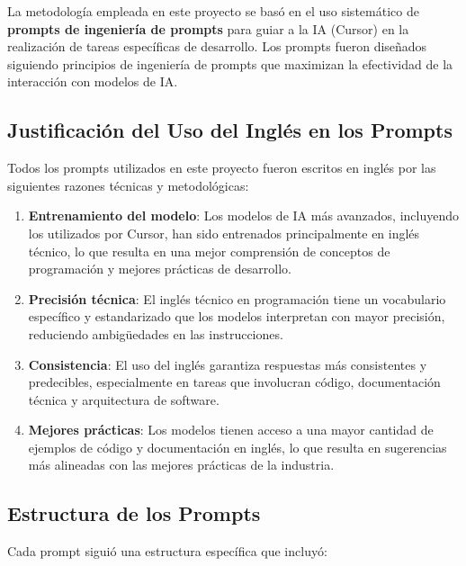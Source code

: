 \documentclass[12pt,a4paper]{article}
\begin{document}
La metodología empleada en este proyecto se basó en el uso sistemático de \textbf{prompts de ingeniería de prompts} para guiar a la IA (Cursor) en la realización de tareas específicas de desarrollo. Los prompts fueron diseñados siguiendo principios de ingeniería de prompts que maximizan la efectividad de la interacción con modelos de IA.

\subsection{Justificación del Uso del Inglés en los Prompts}

Todos los prompts utilizados en este proyecto fueron escritos en inglés por las siguientes razones técnicas y metodológicas:

\begin{enumerate}
    \item \textbf{Entrenamiento del modelo}: Los modelos de IA más avanzados, incluyendo los utilizados por Cursor, han sido entrenados principalmente en inglés técnico, lo que resulta en una mejor comprensión de conceptos de programación y mejores prácticas de desarrollo.
    
    \item \textbf{Precisión técnica}: El inglés técnico en programación tiene un vocabulario específico y estandarizado que los modelos interpretan con mayor precisión, reduciendo ambigüedades en las instrucciones.
    
    \item \textbf{Consistencia}: El uso del inglés garantiza respuestas más consistentes y predecibles, especialmente en tareas que involucran código, documentación técnica y arquitectura de software.
    
    \item \textbf{Mejores prácticas}: Los modelos tienen acceso a una mayor cantidad de ejemplos de código y documentación en inglés, lo que resulta en sugerencias más alineadas con las mejores prácticas de la industria.
\end{enumerate}

\subsection{Estructura de los Prompts}

Cada prompt siguió una estructura específica que incluyó:
\end{document}

